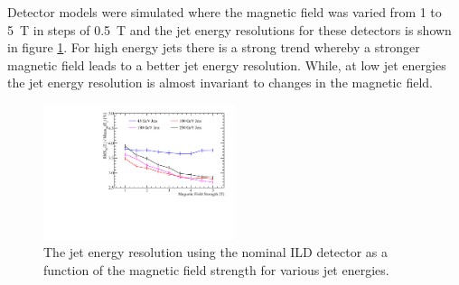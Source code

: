 Detector models were simulated where the magnetic field was varied from 1 to 5~T in steps of 0.5~T and the jet energy resolutions for these detectors is shown in figure \ref{fig:bfield}.  For high energy jets there is a strong trend whereby a stronger magnetic field leads to a better jet energy resolution.  While, at low jet energies the jet energy resolution is almost invariant to changes in the magnetic field.  

\begin{figure}[h!]
\includegraphics[width=0.5\textwidth]{OptimisationStudies/Plots/JetEnergyResolutions/JER_vs_MagneticFieldStrength.pdf}
\caption[The jet energy resolution using the nominal ILD detector as a function of the magnetic field strength for various jet energies.]{The jet energy resolution using the nominal ILD detector as a function of the magnetic field strength for various jet energies.}
\label{fig:bfield}
\end{figure}

